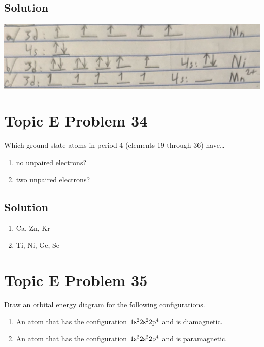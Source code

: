 \documentclass[10pt]{article}
\begin{document}
        \subsection{Solution}
            \begin{center}
                \includegraphics[width=\textwidth]{S-E33.jpg}
            \end{center}

    \pagebreak
    \section{Topic E Problem 34}
        Which ground-state atoms in period 4 (elements 19 through 36) have…
        \begin{enumerate}[label=\alph*)]
            \item   no unpaired electrons?
            \item   two unpaired electrons?
        \end{enumerate}

        \subsection{Solution}
            \begin{enumerate}[label=\alph*/]
                \item   Ca, Zn, Kr
                \item   Ti, Ni, Ge, Se
            \end{enumerate}


    \pagebreak
    \section{Topic E Problem 35}
        Draw an orbital energy diagram for the following configurations.
        \begin{enumerate}
            \item   An atom that has the configuration $\rm 1s^2 2s^2 2p^4$ and is diamagnetic.
            \item   An atom that has the configuration $\rm 1s^2 2s^2 2p^4$ and is paramagnetic.
        \end{enumerate}
\end{document}
